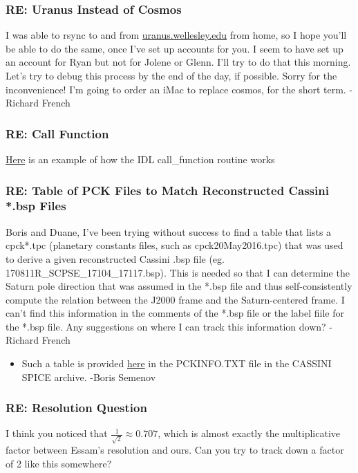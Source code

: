 \documentclass[crop=false,class=book]{standalone}
\begin{document}
\subsubsection{\footnotesize RE: Uranus Instead of Cosmos}
I was able to rsync to and from \url{uranus.wellesley.edu} from home, so I hope you'll be able to do the same, once I've set up accounts for you. I seem to have set up an account for Ryan but not for Jolene or Glenn. I'll try to do that this morning. Let's try to debug this process by the end of the day, if possible. Sorry for the inconvenience! I'm going to order an iMac to replace cosmos, for the short term. -Richard French
\subsubsection{\footnotesize RE: Call Function}
\href{http://www.harrisgeospatial.com/docs/CALL_FUNCTION.html}{Here} is an example of how the IDL call\_function routine works
\subsubsection{\footnotesize RE: Table of PCK Files to Match Reconstructed Cassini *.bsp Files}
Boris and Duane, I've been trying without success to find a table that lists a cpck*.tpc (planetary constants files, such as cpck20May2016.tpc) that was used to derive a given reconstructed Cassini .bsp file (eg. 170811R\_SCPSE\_17104\_17117.bsp). This is needed so that I can determine the Saturn pole direction that was assumed in the *.bsp file and thus self-consistently compute the relation between the J2000 frame and the Saturn-centered frame. I can't find this information in the comments of the *.bsp file or the label fiile for the *.bsp file. Any suggestions on where I can track this information down? -Richard French
\begin{itemize}
    \item Such a table is provided \href{https://naif.jpl.nasa.gov/pub/naif/pds/data/co-s_j_e_v-spice-6-v1.0/cosp_1000/data/pck/pckinfo.txt}{here} in the PCKINFO.TXT file in the CASSINI SPICE archive. -Boris Semenov
\end{itemize}
\subsubsection{\footnotesize RE: Resolution Question}
I think you noticed that $\frac{1}{\sqrt{2}}\approx 0.707$, which is almost exactly the multiplicative factor between Essam's resolution and ours. Can you try to track down a factor of 2 like this somewhere?
\end{document}
